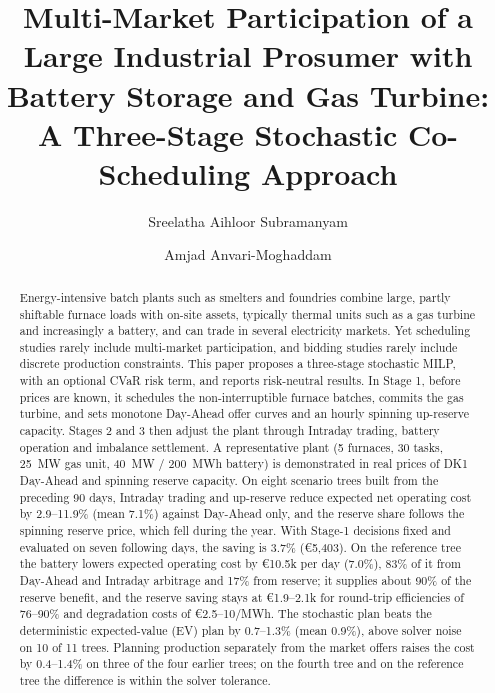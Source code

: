 \documentclass[5p,times,twocolumn]{elsarticle}
\begin{document}
\begin{frontmatter}

\title{Multi-Market Participation of a Large Industrial Prosumer with Battery Storage and Gas Turbine: A Three-Stage Stochastic Co-Scheduling Approach}

\author[inst1]{Sreelatha Aihloor Subramanyam}
\author[inst1]{Amjad Anvari-Moghaddam}

\begin{abstract}
Energy-intensive batch plants such as smelters and foundries combine large, partly shiftable furnace loads with on-site assets, typically thermal units such as a gas turbine and increasingly a battery, and can trade in several electricity markets. Yet scheduling studies rarely include multi-market participation, and bidding studies rarely include discrete production constraints. This paper proposes a three-stage stochastic MILP, with an optional CVaR risk term, and reports risk-neutral results. In Stage 1, before prices are known, it schedules the non-interruptible furnace batches, commits the gas turbine, and sets monotone Day-Ahead offer curves and an hourly spinning up-reserve capacity. Stages 2 and 3 then adjust the plant through Intraday trading, battery operation and imbalance settlement. A representative plant (5 furnaces, 30 tasks, 25~MW gas unit, 40~MW / 200~MWh battery) is demonstrated in real prices of DK1 Day-Ahead and spinning reserve capacity. On eight scenario trees built from the preceding 90 days, Intraday trading and up-reserve reduce expected net operating cost by 2.9--11.9\% (mean 7.1\%) against Day-Ahead only, and the reserve share follows the spinning reserve price, which fell during the year. With Stage-1 decisions fixed and evaluated on seven following days, the saving is 3.7\% (\euro 5,403). On the reference tree the battery lowers expected operating cost by \euro 10.5k per day (7.0\%), 83\% of it from Day-Ahead and Intraday arbitrage and 17\% from reserve; it supplies about 90\% of the reserve benefit, and the reserve saving stays at \euro 1.9--2.1k for round-trip efficiencies of 76--90\% and degradation costs of \euro 2.5--10/MWh. The stochastic plan beats the deterministic expected-value (EV) plan by 0.7--1.3\% (mean 0.9\%), above solver noise on 10 of 11 trees. Planning production separately from the market offers raises the cost by 0.4--1.4\% on three of the four earlier trees; on the fourth tree and on the reference tree the difference is within the solver tolerance.
\end{abstract}


\end{frontmatter}
\end{document}
